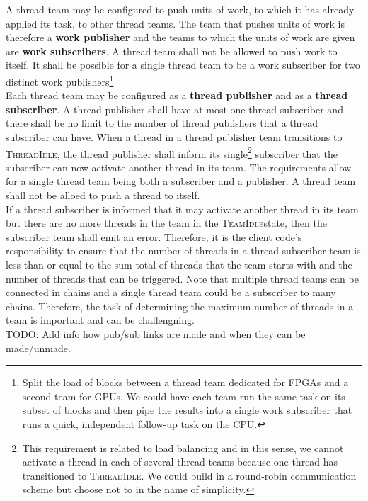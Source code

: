 \documentclass{article}
\newcommand{\TeamIdle}          {\textsc{TeamIdle}}
\newcommand{\ThreadIdle}        {\textsc{ThreadIdle}}
\begin{document}
A thread team may be configured to push units of work, to which it has already
applied its task, to other thread teams.  The team that pushes units of work is
therefore a \textbf{work publisher} and the teams to which the units of work are
given are \textbf{work subscribers}.  A thread team shall not be allowed to push
work to itself.  It shall be possible for a single thread team to be a work
subscriber for two distinct work publishers\footnote{Split the load of blocks
between a thread team dedicated for FPGAs and a second team for GPUs.  We could
have each team run the same task on its subset of blocks and then pipe the
results into a single work subscriber that runs a quick, independent follow-up
task on the CPU.}\\

Each thread team may be configured as a \textbf{thread publisher} and as a
\textbf{thread subscriber}.  A thread publisher shall have at most one thread
subscriber and there shall be no limit to the number of thread publishers that a
thread subscriber can have.  When a thread in a thread publisher team
transitions to \ThreadIdle, the thread publisher shall inform its
single\footnote{This requirement is related to load balancing and in this sense,
we cannot activate a thread in each of several thread teams because one thread
has transitioned to \ThreadIdle.  We could build in a round-robin communication
scheme but choose not to in the name of simplicity.} subscriber that the
subscriber can now activate another thread in its team.  The requirements allow
for a single thread team being both a subscriber and a publisher.  A thread team
shall not be alloed to push a thread to itself.\\

If a thread subscriber is informed that it may activate another thread in its
team but there are no more threads in the team in the \TeamIdle state, then the
subscriber team shall emit an error.  Therefore, it is the client code's
responsibility to ensure that the number of threads in a thread subscriber team
is less than or equal to the sum total of threads that the team starts with and
the number of threads that can be triggered.  Note that multiple thread teams
can be connected in chains and a single thread team could be a subscriber to
many chains.  Therefore, the task of determining the maximum number of threads
in a team is important and can be challengning.\\

TODO: Add info how pub/sub links are made and when they can be made/unmade.\\
\end{document}
